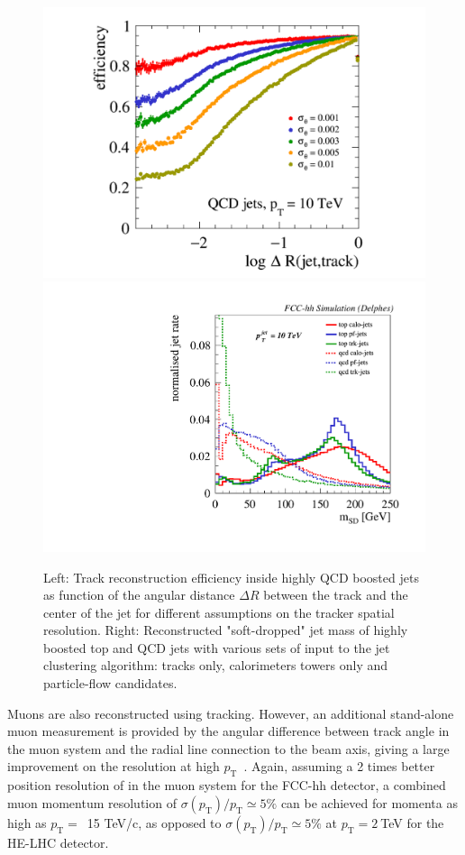 \documentclass[a4paper,11pt]{article}
\newcommand{\pt}{\ensuremath{p_{\text{T}}}}
\begin{document}
\begin{figure}[htb!]
  \centering
  \includegraphics[width=0.56\columnwidth]{Fig/dtf.pdf}
  \includegraphics[width=0.42\columnwidth]{Fig/jetalgo.pdf}
  \caption{Left: Track reconstruction efficiency inside highly QCD boosted jets as function of the angular distance $\Delta R$ between the track and the center of the jet for different assumptions on the tracker spatial resolution. Right: Reconstructed 
  "soft-dropped" jet mass of highly boosted top and QCD jets with various sets of input to the jet clustering algorithm: tracks only, calorimeters towers only and particle-flow candidates. }
  \label{fig:substructure}
\end{figure}

Muons are also reconstructed using tracking. However, an additional stand-alone muon measurement is provided by the angular difference between track angle in the muon system and the radial line connection to the beam axis, giving a large improvement on the resolution at high \pt~\cite{cdr_volume3}. Again, assuming a 2 times better position resolution of in the muon system for the FCC-hh detector, a combined muon momentum resolution of $\sigma(\pt)/\pt  \simeq 5\%$ can be achieved for momenta as high as $\pt=$~15 TeV/c, as opposed to $\sigma(\pt)/\pt \simeq 5\%$ at $\pt=2~$TeV for the HE-LHC detector.
\end{document}
